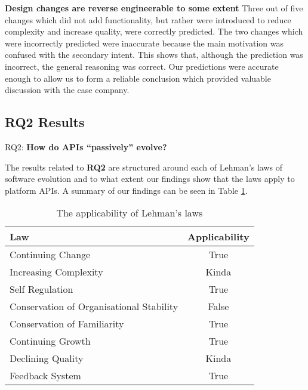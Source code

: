 \documentclass{sig-alternate}
\begin{document}
\smallskip \noindent
\textbf{Design changes are reverse engineerable to some extent  }  %
Three out of five changes which did not add functionality, but rather were introduced to reduce complexity and increase quality, were correctly predicted. The two changes which were incorrectly predicted were inaccurate because the main motivation was confused with the secondary intent. This shows that, although the prediction was incorrect, the general reasoning was correct. Our predictions were accurate enough to allow us to form a reliable conclusion which provided valuable discussion with the case company. 


\subsection{RQ2 Results} \label{results_rq2} 
\noindent
RQ2: \textbf{How do APIs ``passively'' evolve?}
\smallskip

The results related to \textbf{RQ2} are structured around each of Lehman's laws of software evolution \cite{lehman1980programs} and to what extent our findings show that the laws apply to platform APIs. A summary of our findings can be seen in Table \ref{table:lehman}. 


\begin{table}
       \centering
       \begin{tabular}[ht]{l|c}
              \toprule

              \textbf{Law}                              & \textbf{Applicability}    \\ \midrule
              Continuing Change                         & True                      \\ \hline
              Increasing Complexity                     & Kinda                     \\ \hline
              Self Regulation                           & True                      \\ \hline
              Conservation of Organisational Stability  & False                     \\ \hline
              Conservation of Familiarity               & True                      \\ \hline
              Continuing Growth                         & True                      \\ \hline
              Declining Quality                         & Kinda                     \\ \hline
              Feedback System                           & True                      \\ 

              \bottomrule

       \end{tabular}
       \caption{The applicability of Lehman's laws}
       \label{table:lehman}
\end{table}
\end{document}

